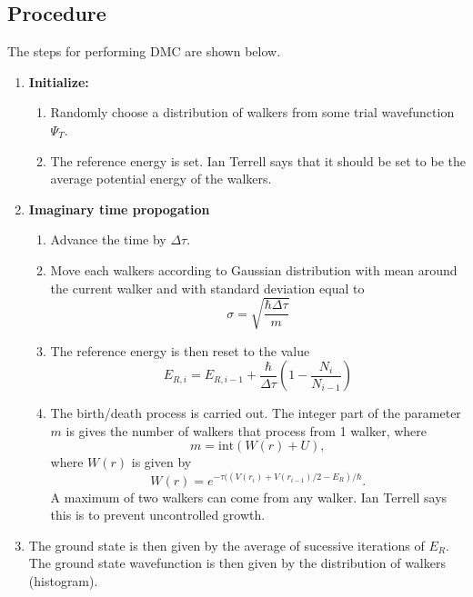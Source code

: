 \subsection*{Procedure}
The steps for performing DMC are shown below.
\begin{enumerate}
\item \textbf{Initialize:}
  \begin{enumerate}
  \item Randomly choose a distribution of walkers from some trial wavefunction $\Psi_T$.
  \item The reference energy is set. Ian Terrell says that it should be set to be the average potential energy of the walkers.
  \end{enumerate}

\item \textbf{Imaginary time propogation}
  \begin{enumerate}
  \item Advance the time by $\Delta \tau$.
  \item Move each walkers according to Gaussian distribution with mean around the current walker and with standard deviation equal to
    \begin{equation}
      \sigma = \sqrt{\frac{\hbar \Delta \tau}{m}}
    \end{equation}
  \item The reference energy is then reset to the value
    \begin{equation}
      E_{R,i} = E_{R,i-1} + \frac{\hbar}{\Delta \tau} \left( 1-\frac{N_i}{N_{i-1}}\right)
    \end{equation}
  \item The birth/death process is carried out. The integer part of the parameter $m$ is gives the number of walkers that process from 1 walker, where
    \begin{equation}
      m = \mathrm{int} (W(r)+U),
    \end{equation}
    where $W(r)$ is given by
    \begin{equation}
      W(r) = e^{-\tau((V(r_i)+V(r_{i-1})/2 - E_R)/\hbar}.
    \end{equation}
    A maximum of two walkers can come from any walker. Ian Terrell says this is to prevent uncontrolled growth.
  \end{enumerate}

\item The ground state is then given by the average of sucessive iterations of $E_R$. The ground state wavefunction is then given by the distribution of walkers (histogram).
\end{enumerate}
